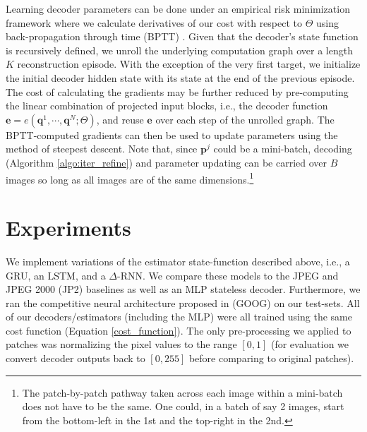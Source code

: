 \documentclass[smallabstract,smallcaptions]{dccpaper}
\begin{document}
Learning decoder parameters can be done under an empirical risk minimization framework where we calculate derivatives of our cost with respect to $\Theta$ using back-propagation through time (BPTT) \cite{werbos1988bptt}. Given that the decoder's state function is recursively defined, we unroll the underlying computation graph over a length $K$ reconstruction episode. With the exception of the very first target, we initialize the initial decoder hidden state with its state at the end of the previous episode. The cost of calculating the gradients may be further reduced by pre-computing the linear combination of projected input blocks, i.e., the decoder function $\mathbf{e} = e(\mathbf{q}^1, \cdots, \mathbf{q}^N ; \Theta)$, and reuse $\mathbf{e}$ over each step of the unrolled graph. The BPTT-computed gradients can then be used to update parameters using the method of steepest descent.
Note that, since $\mathbf{p}^j$ could be a mini-batch, decoding (Algorithm \ref{algo:iter_refine}) and parameter updating can be carried over $B$ images so long as all images are of the same dimensions.\footnote{The patch-by-patch pathway taken across each image within a mini-batch does not have to be the same. One could, in a batch of say 2 images, start from the bottom-left in the 1st and the top-right in the 2nd.%
}

\section{Experiments}
\label{experiments}
We implement variations of the estimator state-function described above, i.e., a GRU, an LSTM, and a $\Delta$-RNN.
We compare these models to the JPEG and JPEG 2000 (JP2) baselines as well as an MLP stateless decoder.  Furthermore, we ran the competitive neural architecture proposed in \cite{toderici2016full} (GOOG) on our test-sets. All of our decoders/estimators (including the MLP) were all trained using the same cost function (Equation \ref{cost_function}). The only pre-processing we applied to patches was normalizing the pixel values to the range $[0,1]$ (for evaluation we convert decoder outputs back to $[0,255]$ before comparing to original patches).
\end{document}

